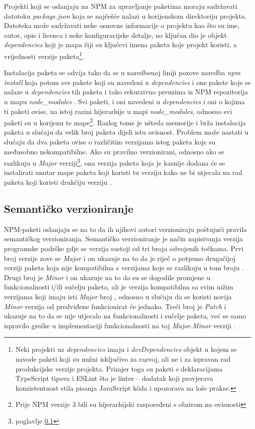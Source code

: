 \documentclass[times, utf8, diplomski, numeric]{fer}
\newcommand{\razmakp}{\vspace{18pt}}
\begin{document}
\razmakp

Projekti koji se oslanjaju na NPM za upravljanje paketima moraju sadržavati datoteku \emph{package.json} koja se najčešće nalazi u korijenskom direktoriju projekta.
Datoteka može sadržavati neke osnovne informacije o projektu kao što su ime, autor, opis i licenca i neke konfiguracijske detalje, no ključan dio je objekt \emph{dependencies} koji je mapa čiji su ključevi imena paketa koje projekt koristi, a vrijednosti verzije paketa\footnote{
    Neki projekti uz \emph{dependencies} imaju i \emph{devDependencies} objekt u kojem se navode paketi koji su nužni isključivo za razvoj, ali ne i za ispravan rad produkcijske verzije projekta. Primjer toga su paketi s deklaracijama TypeScript tipova i ESLint što je linter – dodatak koji provjerava konzistentnost stila pisanja JavaScript kôda i upozorava na loše prakse.
}.

Instalacija paketa se odvija tako da se u naredbenoj liniji pozove naredba \emph{npm install} koja potom sve pakete koji su navedeni u \emph{dependencies} i one pakete koje se nalaze u \emph{dependencies} tih paketa i tako rekurzivno preuzima iz NPM repozitorija u mapu \emph{node\_modules} \citep{npm_docs}.
Svi paketi, i oni navedeni u \emph{dependencies} i oni o kojima ti paketi ovise, na istoj razini hijerarhije u mapi \emph{node\_modules}, odnosno svi paketi su u korijenu te mape\footnote{Prije NPM verzije 3 bili su hijerarhijski raspoređeni s obzirom na ovisnosti}.
Razlog tome je ušteda memorije i brža instalacija paketa u slučaju da velik broj paketa dijeli istu ovisnost.
Problem može nastati u slučaju da dva paketa ovise o različitim verzijama istog paketa koje su međusobno nekompatibilne.
Ako su pravilno verzionirani, odnosno ako se razlikuju u \emph{Major} verziji\footnote{poglavlje \ref{sec:semver}}, ona verzija paketa koja je kasnije dodana će se instalirati unutar mape paketa koji koristi tu verziju kako ne bi utjecala na rad paketa koji koristi drukčiju verziju \citep{npm_npm3}.


\newpage
\subsection{Semantičko verzioniranje} \label{sec:semver}

NPM-paketi oslanjaju se na to da ih njihovi autori verzioniraju poštujući pravila semantičkog verzioniranja.
Semantičko verzioniranje je način zapisivanja verzija programske podrške gdje se verzija sastoji od tri broja odvojenih točkama.
Prvi broj verzije zove se \emph{Major} i on ukazuje na to da je riječ o potpuno drugačijoj verziji paketa koja nije kompatibilna s verzijama koje se razlikuju u tom broju .
Drugi broj je \emph{Minor} i on ukazuje na to da su se dogodile promjene u funkcionalnosti i/ili sučelju paketa, ali je verzija kompatibilna sa svim nižim verzijama koji imaju isti \emph{Major} broj , odnosno u slučaju da se koristi novija \emph{Minor} verzija od predviđene funkcionirat će jednako.
Treći broj je \emph{Patch} i ukazuje na to da se nije utjecalo na funkcionalnosti i sučelje paketa, već se samo ispravilo greške u implementaciji funkcionalnosti na toj \emph{Major.Minor} verziji \citep{semver}.
\end{document}
